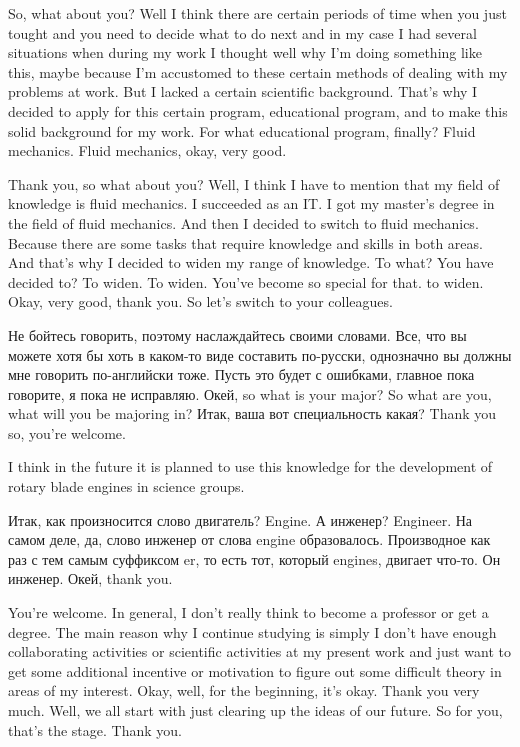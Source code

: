 \documentclass[main.tex]{subfiles}
\begin{document}
So, what about you?
Well I think there are certain periods of time when you just tought and you need to decide what to do next and in my case I had several situations when during my work I thought well why I'm doing something like this, maybe because I'm accustomed to these certain methods of dealing with my problems at work.
But I lacked a certain scientific background.
That's why I decided to apply for this certain program, educational program, and to make this solid background for my work.
For what educational program, finally? Fluid mechanics.
Fluid mechanics, okay, very good.


Thank you, so what about you?
Well, I think I have to mention that my field of knowledge is fluid mechanics.
I succeeded as an IT.
I got my master's degree in the field of fluid mechanics.
And then I decided to switch to fluid mechanics.
Because there are some tasks that require knowledge and skills in both areas.
And that's why I decided to widen my range of knowledge.
To what? You have decided to? To widen. To widen.
You've become so special for that.
to widen.
Okay, very good, thank you.
So let's switch to your colleagues.

Не бойтесь говорить, поэтому наслаждайтесь своими словами.
Все, что вы можете хотя бы хоть в каком-то виде составить по-русски, однозначно вы должны мне говорить по-английски тоже.
Пусть это будет с ошибками, главное пока говорите, я пока не исправляю.
Окей, so what is your major? So what are you, what will you be majoring in? Итак, ваша вот специальность какая? 
Thank you so, you're welcome.

I think in the future it is planned to use this knowledge for the development of rotary blade engines in science groups.

Итак, как произносится слово двигатель? Engine.
А инженер? Engineer.
На самом деле, да, слово инженер от слова engine образовалось.
Производное как раз с тем самым суффиксом er, то есть тот, который engines, двигает что-то.
Он инженер.
Окей, thank you.

You're welcome.
In general, I don't really think to become a professor or get a degree.
The main reason why I continue studying is simply I don't have enough collaborating activities or scientific activities at my present work and just want to get some additional incentive or motivation to figure out some difficult theory in areas of my interest.
Okay, well, for the beginning, it's okay.
Thank you very much.
Well, we all start with just clearing up the ideas of our future.
So for you, that's the stage.
Thank you.
\end{document}
